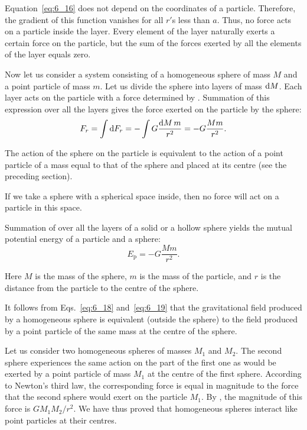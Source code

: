 Equation~\eqref{eq:6_16} does not depend on the coordinates of a particle. Therefore, the gradient of this function vanishes for all $r'$s less than $a$. Thus, no force acts on a particle inside the layer. Every element of the layer naturally exerts a certain force on the particle, but the sum of the forces exerted by all the elements of the layer equals zero.

Now let us consider a system consisting of a homogeneous sphere of mass $M$ and a point particle of mass $m$. Let us divide the sphere into layers of mass $\mathrm{d} M$. Each layer acts on the particle with a force determined by . Summation of this expression over all the layers gives the force exerted on the particle by the sphere:
\begin{equation}\label{eq:6_18}
	F_r = \int\mathrm{d} F_r = -\int G\frac{\mathrm{d} M\,m}{r^2} = -G\frac{Mm}{r^2}.
\end{equation}

\noindent
The action of the sphere on the particle is equivalent to the action of a point particle of a mass equal to that of the sphere and placed at its centre (see the preceding section).

If we take a sphere with a spherical space inside, then no force will act on a particle in this space.

Summation of  over all the layers of a solid or a hollow sphere yields the mutual potential energy of a particle and a sphere:
\begin{equation}\label{eq:6_19}
	E_{\text{p}} = -G\frac{Mm}{r^2}.
\end{equation}

\noindent
Here $M$ is the mass of the sphere, $m$ is the mass of the particle, and $r$ is the distance from the particle to the centre of the sphere.

It follows from Eqs.~\eqref{eq:6_18} and~\eqref{eq:6_19} that the gravitational field produced by a homogeneous sphere is equivalent (outside the sphere) to the field produced by a point particle of the same mass at the centre of the sphere.

Let us consider two homogeneous spheres of masses $M_1$ and $M_2$. The second sphere experiences the same action on the part of the first one as would be exerted by a point particle of mass $M_1$ at the centre of the first sphere. According to Newton's third law, the corresponding force is equal in magnitude to the force that the second sphere would exert on the particle $M_1$. By , the magnitude of this force is $GM_1M_2/r^2$. We have thus proved that homogeneous spheres interact like point particles at their centres.

